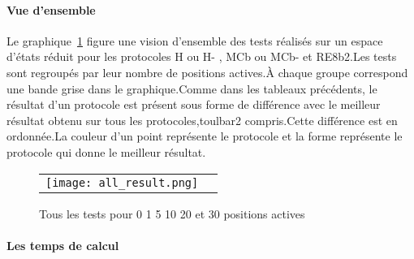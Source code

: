    \paragraph{Vue d'ensemble}

Le graphique~\ref{graph:all_result} figure une vision d'ensemble des tests réalisés sur un espace d'états réduit pour les protocoles H ou H- , MCb ou MCb- et RE8b2.Les tests sont regroupés par leur nombre de positions actives.À chaque groupe correspond une bande grise dans le graphique.Comme dans les tableaux précédents, le résultat d'un protocole est présent sous forme de différence avec le meilleur résultat obtenu sur tous les protocoles,toulbar2 compris.Cette différence est en ordonnée.La couleur d'un point représente le protocole et la forme représente le protocole qui donne le meilleur résultat.


    \begin{figure}[h]
      \centering
      \begin{tabular}{cc}
        \texttt{[image: all\_result.png]} 
      \end{tabular}
      
      \caption{Tous les tests pour 0 1 5 10 20 et 30 positions actives}
\label{graph:all_result}
    \end{figure}


    \paragraph{Les temps de calcul} 

